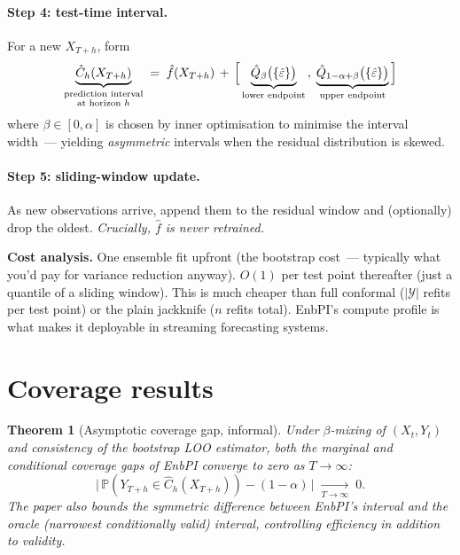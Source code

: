 \documentclass[letterpaper,11pt,leqno]{article}
\newtheorem*{thmstar}{Theorem}
\begin{document}
\paragraph{Step 4: test-time interval.} For a new $X_{T+h}$, form
\begin{equation*}
\underbrace{\hat{C}_h(X_{T+h})}_{\substack{\text{prediction interval}\\\text{at horizon } h}}
\;=\;
\hat{f}(X_{T+h}) \,+\, \Bigl[\,
\underbrace{\hat{Q}_{\beta}\bigl(\{\hat{\varepsilon}\}\bigr)}_{\text{lower endpoint}}
\,,\;
\underbrace{\hat{Q}_{1-\alpha+\beta}\bigl(\{\hat{\varepsilon}\}\bigr)}_{\text{upper endpoint}}
\,\Bigr]
\end{equation*}
where $\beta \in [0, \alpha]$ is chosen by inner optimisation to minimise the interval width~--- yielding \emph{asymmetric} intervals when the residual distribution is skewed.

\paragraph{Step 5: sliding-window update.} As new observations arrive, append them to the residual window and (optionally) drop the oldest. \emph{Crucially, $\hat{f}$ is never retrained.}

\begin{algorithmexplain}
\textbf{Cost analysis.} One ensemble fit upfront (the bootstrap cost~--- typically what you'd pay for variance reduction anyway). $O(1)$ per test point thereafter (just a quantile of a sliding window). This is much cheaper than full conformal ($|\mathcal{Y}|$ refits per test point) or the plain jackknife ($n$ refits total). EnbPI's compute profile is what makes it deployable in streaming forecasting systems.
\end{algorithmexplain}

\section{Coverage results}\label{s:coverage}

\begin{thmstar}[Asymptotic coverage gap, informal]
Under $\beta$-mixing of $(X_t, Y_t)$ and consistency of the bootstrap LOO estimator, both the \emph{marginal} and \emph{conditional} coverage gaps of EnbPI converge to zero as $T \to \infty$:
\begin{equation*}
\bigl|\,\mathbb{P}(Y_{T+h} \in \hat{C}_h(X_{T+h})) - (1 - \alpha)\,\bigr| \;\xrightarrow[T\to\infty]{} \;0.
\end{equation*}
The paper also bounds the symmetric difference between EnbPI's interval and the oracle (narrowest conditionally valid) interval, controlling \emph{efficiency} in addition to validity.
\end{thmstar}
\end{document}
